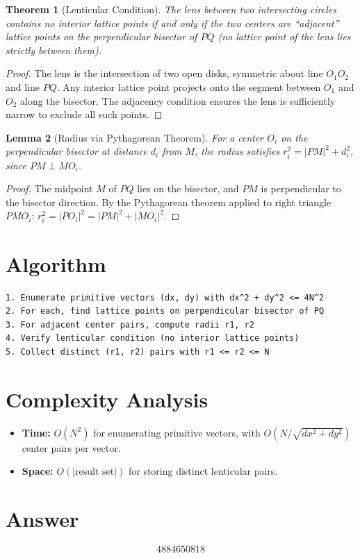 \documentclass[12pt]{article}
\newtheorem{theorem}{Theorem}
\newtheorem{lemma}[theorem]{Lemma}
\begin{document}
\begin{theorem}[Lenticular Condition]
The lens between two intersecting circles contains no interior lattice points if and only if the two centers are ``adjacent'' lattice points on the perpendicular bisector of $PQ$ (no lattice point of the lens lies strictly between them).
\end{theorem}

\begin{proof}
The lens is the intersection of two open disks, symmetric about line $O_1O_2$ and line $PQ$. Any interior lattice point projects onto the segment between $O_1$ and $O_2$ along the bisector. The adjacency condition ensures the lens is sufficiently narrow to exclude all such points.
\end{proof}

\begin{lemma}[Radius via Pythagorean Theorem]
For a center $O_i$ on the perpendicular bisector at distance $d_i$ from $M$, the radius satisfies $r_i^2 = |PM|^2 + d_i^2$, since $PM \perp MO_i$.
\end{lemma}

\begin{proof}
The midpoint $M$ of $PQ$ lies on the bisector, and $PM$ is perpendicular to the bisector direction. By the Pythagorean theorem applied to right triangle $PMO_i$: $r_i^2 = |PO_i|^2 = |PM|^2 + |MO_i|^2$.
\end{proof}

\section{Algorithm}

\begin{verbatim}
1. Enumerate primitive vectors (dx, dy) with dx^2 + dy^2 <= 4N^2
2. For each, find lattice points on perpendicular bisector of PQ
3. For adjacent center pairs, compute radii r1, r2
4. Verify lenticular condition (no interior lattice points)
5. Collect distinct (r1, r2) pairs with r1 <= r2 <= N
\end{verbatim}

\section{Complexity Analysis}
\begin{itemize}
\item \textbf{Time:} $O(N^2)$ for enumerating primitive vectors, with $O(N/\sqrt{dx^2+dy^2})$ center pairs per vector.
\item \textbf{Space:} $O(|\text{result set}|)$ for storing distinct lenticular pairs.
\end{itemize}

\section{Answer}

\[
\boxed{4884650818}
\]
\end{document}
